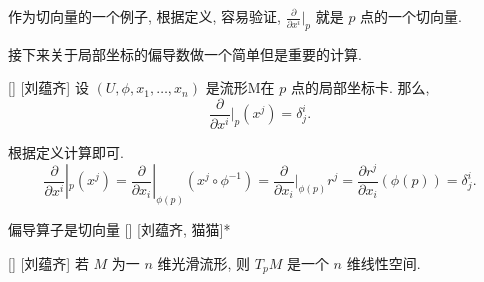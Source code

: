 \documentclass[UTF8]{ctexart}
\begin{document}
        \begin{rmk}
            []
            作为切向量的一个例子, 根据定义, 容易验证,  \(\frac{\partial}{\partial x^i} |_p\) 就是 \(p\) 点的一个切向量. 
        \end{rmk}

        接下来关于局部坐标的偏导数做一个简单但是重要的计算. 
        
        \begin{ppt}
            []
            {}
            []
            [刘蕴齐]
            设 \((U, \phi, x_1, \dots, x_n)\) 是流形M在 \(p\) 点的局部坐标卡. 那么, 
            \[
                \frac{\partial}{\partial x^i} |_p (x^j) = \delta^i_{j}.
            \]
        \end{ppt}

        \begin{prf}
            根据定义计算即可. 
            \[
            \frac{\partial}{\partial x^i} |_p (x^j)
            =
            \frac{\partial}{\partial x_i}|_{\phi(p)} (x^j \circ \phi^{-1} )
            =
            \frac{\partial}{\partial x_i}|_{\phi(p)} r^j
            =
            \frac{\partial r^j}{\partial x_i}(\phi(p))
            =
            \delta^i_{j}.
            \]
        \end{prf}

        \begin{ppt}
            []
            {偏导算子是切向量}
            []
            [刘蕴齐, 猫猫]*
        \end{ppt}
        
        \begin{thm}
            []
            {}
            []
            [刘蕴齐]
            若 \(M\) 为一 \(n\) 维光滑流形, 则 \(T_p M\) 是一个 \(n\) 维线性空间. 
        \end{thm}
        
\end{document}
